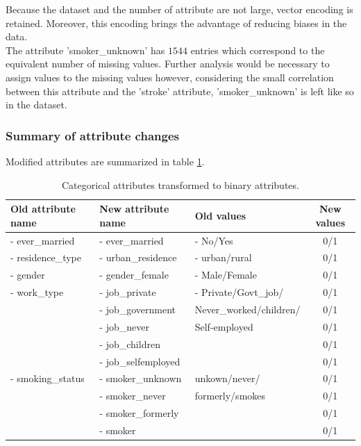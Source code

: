 Because the dataset and the number of attribute are not large, vector encoding is retained. Moreover, 
this encoding brings the advantage of reducing biases in the data.\\ 

The attribute 'smoker\_unknown' has $1544$ entries which correspond to the equivalent number of 
missing values. Further analysis would be necessary to assign values to the missing values however, 
considering the small correlation between this attribute and the 'stroke' attribute, 
'smoker\_unknown' is left like so in the dataset.


\subsubsection{Summary of attribute changes}
Modified attributes are summarized in table \ref{table_new_attributes}.

\begin{table}[H]\begin{tabular}{|lllc|}
\hline
\textbf{Old attribute name} & \textbf{New attribute name} & \textbf{Old values} & \textbf{New values} \\ \hline \hline
- ever\_married   & - ever\_married     & - No/Yes                & 0/1 \\ \hline
- residence\_type & - urban\_residence  & - urban/rural           & 0/1 \\ \hline
- gender          & - gender\_female    & - Male/Female           & 0/1 \\ \hline
- work\_type      & - job\_private      & - Private/Govt\_job/    & 0/1 \\
                  & - job\_government   & Never\_worked/children/ & 0/1 \\
                  & - job\_never        & Self-employed           & 0/1 \\
                  & - job\_children     &                         & 0/1 \\
                  & - job\_selfemployed &                         & 0/1 \\ \hline
- smoking\_status & - smoker\_unknown   & unkown/never/           & 0/1 \\
                  & - smoker\_never     & formerly/smokes         & 0/1 \\
                  & - smoker\_formerly  &                         & 0/1 \\
                  & - smoker            &                         & 0/1 \\ \hline
\end{tabular}
\caption{Categorical attributes transformed to binary attributes.}
\label{table_new_attributes}
\end{table}

